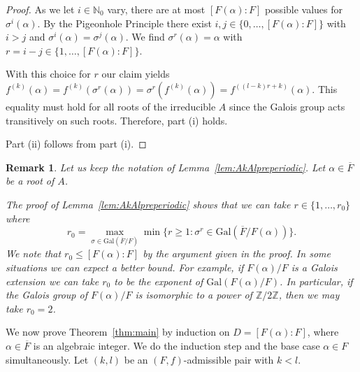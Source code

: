 \documentclass[12pt,oneside,a4]{amsart}
\newcommand{\IN}{\mathbb{N}}
\newcommand{\IZ}{\mathbb{Z}}
\newcounter{maincounter}
\numberwithin{maincounter}{section}
\numberwithin{equation}{section}
\newtheorem{remark}[maincounter]{Remark}
\begin{document}
\begin{proof}
  As we let $i\in\IN_0$ vary, there are at most $[F(\alpha):F]$
  possible values for $\sigma^i(\alpha)$. By the Pigeonhole Principle
  there exist
  $i,j\in \{0,\ldots,[F(\alpha):F]\}$ with $i>j$ and
  $\sigma^i(\alpha)=\sigma^j(\alpha)$. We find
  $\sigma^r(\alpha)=\alpha$ with $r=i-j\in \{1,\ldots,[F(\alpha):F]\}$.
  
  With this choice for $r$ our claim yields
  $f^{(k)}(\alpha)=f^{(k)}(\sigma^r (\alpha))=
  \sigma^r (f^{(k)}(\alpha))= f^{((l-k)r+k)}(\alpha)$.
  This equality must hold for all roots of the
  irreducible $A$ since the Galois group acts transitively on such
  roots.
  Therefore, part (i) holds.

  Part (ii) follows from part (i).
\end{proof}


\begin{remark}
  \label{rem:AkAlpreperiodic}
  Let us keep the notation of Lemma~\ref{lem:AkAlpreperiodic}.
  Let $\alpha\in\overline F$ be a root of $A$.

  The proof of Lemma~\ref{lem:AkAlpreperiodic}
    shows that we can take $r\in \{1,\ldots,r_0\}$ where
    \begin{equation*}
      r_0 =
      \max_{  \sigma\in \mathrm{Gal}(\overline F/F)}
      \min \{r\ge 1 : \sigma^r \in \mathrm{Gal}(\overline
      F/F(\alpha))\}.
    \end{equation*}    
    We note that $r_0\le [F(\alpha):F]$ by the argument given in the
    proof.
    In some situations we can expect a better bound. For
    example, if $F(\alpha)/F$ is a Galois extension we can take $r_0$ to
    be the exponent of $\mathrm{Gal}(F(\alpha)/F)$. In particular, if
    the  Galois group of $F(\alpha)/F$ is
    isomorphic to a 
    power of $\IZ/2\IZ$, then we may take $r_0=2$.
\end{remark}

We now prove Theorem~\ref{thm:main} by induction on $D=[F(\alpha):F]$, where
 $\alpha\in\overline F$ is an algebraic integer. We do the
induction step and the base case $\alpha\in F$ simultaneously.
Let $(k,l)$ be an $(F,f)$-admissible pair with $k<l$. 
\end{document}
